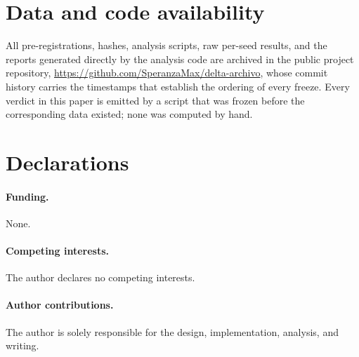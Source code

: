 \documentclass[11pt,a4paper]{article}
\begin{document}
\section*{Data and code availability}

All pre-registrations, hashes, analysis scripts, raw per-seed results, and the reports generated
directly by the analysis code are archived in the public project repository,
\url{https://github.com/SperanzaMax/delta-archivo}, whose commit history carries the timestamps that
establish the ordering of every freeze. Every verdict in this paper is emitted by a script that was
frozen before the corresponding data existed; none was computed by hand.

\section*{Declarations}

\paragraph{Funding.} None.
\paragraph{Competing interests.} The author declares no competing interests.
\paragraph{Author contributions.} The author is solely responsible for the design, implementation,
analysis, and writing.
\end{document}
